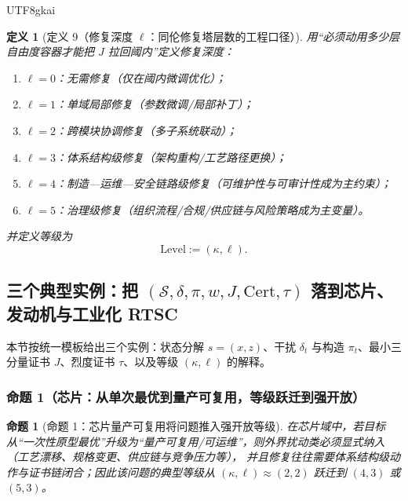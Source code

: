 \documentclass[12pt]{article}
\newtheorem{definition}{定义}[section]
\newtheorem{proposition}{命题}[section]
\newcommand{\Cert}{\ensuremath{\mathrm{Cert}}}
\begin{document}
\begin{CJK*}{UTF8}{gkai}
\begin{definition}[定义 9（修复深度 $\ell$：同伦修复塔层数的工程口径）]
用“必须动用多少层自由度容器才能把 $J$ 拉回阈内”定义修复深度：
\begin{enumerate}
  \item $\ell=0$：无需修复（仅在阈内微调优化）；
  \item $\ell=1$：单域局部修复（参数微调/局部补丁）；
  \item $\ell=2$：跨模块协调修复（多子系统联动）；
  \item $\ell=3$：体系结构级修复（架构重构/工艺路径更换）；
  \item $\ell=4$：制造—运维—安全链路级修复（可维护性与可审计性成为主约束）；
  \item $\ell=5$：治理级修复（组织流程/合规/供应链与风险策略成为主变量）。
\end{enumerate}
并定义等级为
\[
  \mathrm{Level}:=(\kappa,\ell).
\]
\end{definition}

\subsection{三个典型实例：把 \texorpdfstring{$(\mathcal{S},\delta,\pi,w,J,\Cert,\tau)$}{(S,delta,pi,w,J,Cert,tau)} 落到芯片、发动机与工业化
  RTSC}
\label{subsec:tex25-examples}

本节按统一模板给出三个实例：状态分解 $s=(x,z)$、干扰 $\delta_t$ 与构造 $\pi_t$、最小三分量证书 $J$、烈度证书 $\tau$、以及等级 $(\kappa,\ell)$ 的解释。

\subsubsection{命题 1（芯片：从单次最优到量产可复用，等级跃迁到强开放）}
\label{subsubsec:tex25-chip}

\begin{proposition}[命题 1：芯片量产可复用将问题推入强开放等级]
\label{prop:tex25-chip}
在芯片域中，若目标从“一次性原型最优”升级为“量产可复用/可运维”，则外界扰动类必须显式纳入（工艺漂移、规格变更、供应链与竞争压力等），
并且修复往往需要体系结构级动作与证书链闭合；因此该问题的典型等级从 $(\kappa,\ell)\approx(2,2)$ 跃迁到 $(4,3)$ 或 $(5,3)$。
\end{proposition}


\end{CJK*}
\end{document}
